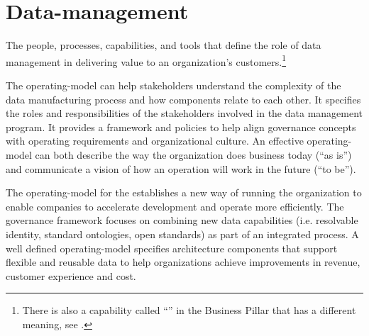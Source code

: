\section[Operating Model]{Data-management }\label{sec:ekgmm-b-4-1} %

The people, processes, capabilities, and tools that define the role of data management in delivering value to an
organization’s customers.\footnote{%
    There is also a capability called ``'' in the
    Business Pillar that has a different meaning, see .
}

The \gls{operating-model} can help stakeholders understand the complexity of the data manufacturing process and how
components relate to each other.
It specifies the roles and responsibilities of the stakeholders involved in the data management program.
It provides a framework and policies to help align governance concepts with operating requirements and
organizational culture.
An effective \gls{operating-model} can both describe the way the organization does business today (“as is”) and
communicate a vision of how an operation will work in the future (“to be”).

\ekgmmContextSection

The \gls{operating-model} for the  establishes a new way of running the organization to enable companies to
accelerate development and operate more efficiently.
The  governance framework focuses on combining new data capabilities (i.e. resolvable identity,
standard ontologies, open standards) as part of an integrated process.
A well defined \gls{operating-model} specifies architecture components that support flexible and reusable data to help
organizations achieve improvements in revenue, customer experience and cost.

\kgmmcorequestionssection

